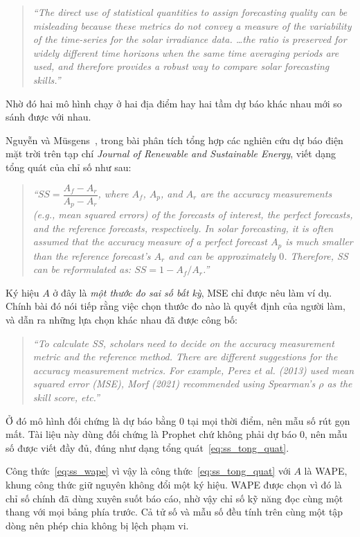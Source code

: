 \documentclass[12pt, a4paper]{report}
\begin{document}
\begin{quote}\small
\textit{``The direct use of statistical quantities to assign forecasting quality can be
misleading because these metrics do not convey a measure of the variability of the time-series
for the solar irradiance data. \dots the ratio is preserved for widely different time horizons
when the same time averaging periods are used, and therefore provides a robust way to compare
solar forecasting skills.''}
\end{quote}

Nhờ đó hai mô hình chạy ở hai địa điểm hay hai tầm dự báo khác nhau mới so sánh được với nhau.

Nguyễn và Müsgens~\cite{nguyen2026meta}, trong bài phân tích tổng hợp các nghiên cứu dự báo điện
mặt trời trên tạp chí \textit{Journal of Renewable and Sustainable Energy}, viết dạng tổng quát
của chỉ số như sau:

\begin{quote}\small
\textit{``$SS = \dfrac{A_f - A_r}{A_p - A_r}$, where $A_f$, $A_p$, and $A_r$ are the accuracy
measurements (e.g., mean squared errors) of the forecasts of interest, the perfect forecasts, and
the reference forecasts, respectively. In solar forecasting, it is often assumed that the accuracy
measure of a perfect forecast $A_p$ is much smaller than the reference forecast's $A_r$ and can be
approximately $0$. Therefore, SS can be reformulated as: $SS = 1 - A_f/A_r$.''}
\end{quote}

Ký hiệu $A$ ở đây là \textit{một thước đo sai số bất kỳ}, MSE chỉ được nêu làm ví dụ. Chính bài
đó nói tiếp rằng việc chọn thước đo nào là quyết định của người làm, và dẫn ra những lựa chọn
khác nhau đã được công bố:

\begin{quote}\small
\textit{``To calculate SS, scholars need to decide on the accuracy measurement metric and the
reference method. There are different suggestions for the accuracy measurement metrics. For
example, Perez et al. (2013) used mean squared error (MSE), Morf (2021) recommended using
Spearman's $\rho$ as the skill score, etc.''}
\end{quote}


Ở đó mô hình đối chứng là dự báo bằng $0$ tại mọi thời điểm, nên mẫu số rút gọn mất. Tài liệu này
dùng đối chứng là Prophet chứ không phải dự báo $0$, nên mẫu số được viết đầy đủ, đúng như dạng
tổng quát~\eqref{eq:ss_tong_quat}.

Công thức~\eqref{eq:ss_wape} vì vậy là công thức~\eqref{eq:ss_tong_quat} với $A$ là WAPE, khung
công thức giữ nguyên không đổi một ký hiệu. WAPE được chọn vì đó là chỉ số chính đã dùng xuyên
suốt báo cáo, nhờ vậy chỉ số kỹ năng đọc cùng một thang với mọi bảng phía trước. Cả tử số và mẫu
số đều tính trên cùng một tập dòng nên phép chia không bị lệch phạm vi.
\end{document}
